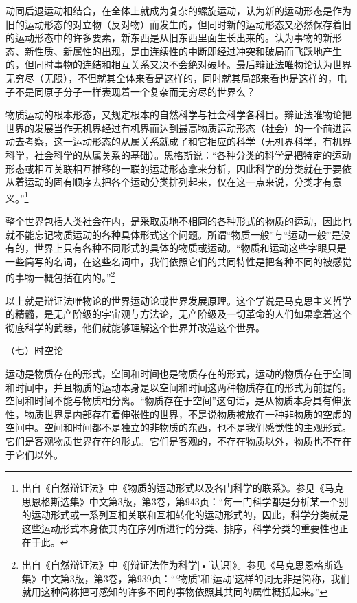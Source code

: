 \documentclass[UTF8, 12pt, a4paper]{ctexrep}
\begin{document}
动同后退运动相结合，在全体上就成为复杂的螺旋运动，认为新的运动形态是作为旧的运动形态的对立物（反对物）而发生的，但同时新的运动形态又必然保存着旧的运动形态中的许多要素，新东西是从旧东西里面生长出来的。认为事物的新形态、新性质、新属性的出现，是由连续性的中断即经过冲突和破局而飞跃地产生的，但同时事物的连结和相互关系又决不会绝对破坏。最后辩证法唯物论认为世界无穷尽（无限），不但就其全体来看是这样的，同时就其局部来看也是这样的，电子不是同原子分子一样表现着一个复杂而无穷尽的世界么？

物质运动的根本形态，又规定根本的自然科学与社会科学各科目。辩证法唯物论把世界的发展当作无机界经过有机界而达到最高物质运动形态（社会）的一个前进运动去考察，这一运动形态的从属关系就成了和它相应的科学（无机界科学，有机界科学，社会科学的从属关系的基础）。恩格斯说：“各种分类的科学是把特定的运动形态或相互关联相互推移的一联的运动形态拿来分析，因此科学的分类就在于要依从着运动的固有顺序去把各个运动分类排列起来，仅在这一点来说，分类才有意义。”\footnote{出自《自然辩证法》中《物质的运动形式以及各门科学的联系》。参见《马克思恩格斯选集》中文第3版，第3卷，第943页：“每一门科学都是分析某一个别的运动形式或一系列互相关联和互相转化的运动形式的，因此，科学分类就是这些运动形式本身依其内在序列所进行的分类、排序，科学分类的重要性也正在于此。}

整个世界包括人类社会在内，是采取质地不相同的各种形式的物质的运动，因此也就不能忘记物质运动的各种具体形式这个问题。所谓“物质一般”与“运动一般”是没有的，世界上只有各种不同形式的具体的物质或运动。“物质和运动这些字眼只是一些简写的名词，在这些名词中，我们依照它们的共同特性是把各种不同的被感觉的事物一概包括在内的。”\footnote{出自《自然辩证法》中《[辩证法作为科学]•[认识]》。参见《马克思恩格斯选集》中文第3版，第3卷，第939页：“‘物质’和‘运动’这样的词无非是简称，我们就用这种简称把可感知的许多不同的事物依照其共同的属性概括起来。”}

以上就是辩证法唯物论的世界运动论或世界发展原理。这个学说是马克思主义哲学的精髓，是无产阶级的宇宙观与方法论，无产阶级及一切革命的人们如果拿着这个彻底科学的武器，他们就能够理解这个世界并改造这个世界。

（七）时空论

运动是物质存在的形式，空间和时间也是物质存在的形式，运动的物质存在于空间和时间中，并且物质的运动本身是以空间和时间这两种物质存在的形式为前提的。空间和时间不能与物质相分离。“物质存在于空间”这句话，是从物质本身具有伸张性，物质世界是内部存在着伸张性的世界，不是说物质被放在一种非物质的空虚的空间中。空间和时间都不是独立的非物质的东西，也不是我们感觉性的主观形式。它们是客观物质世界存在的形式。它们是客观的，不存在物质以外，物质也不存在于它们以外。
\end{document}
